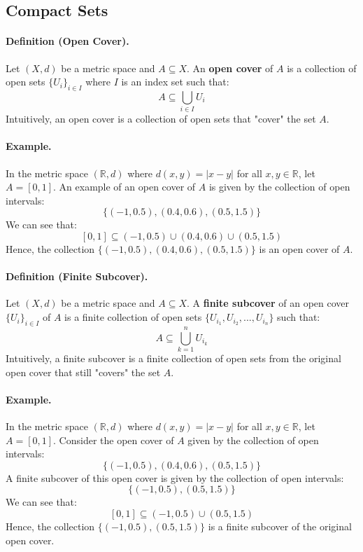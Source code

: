 \documentclass[openany]{book}
\numberwithin{equation}{section}
\begin{document}
\subsection{Compact Sets}
\paragraph{Definition (Open Cover).}

    Let $(X, d)$ be a metric space and $A \subseteq X$. An \textbf{open cover} of $A$ is a collection of open sets $\{U_i\}_{i \in I}$ where $I$ is an index set such that:
    $$A \subseteq \bigcup_{i \in I} U_i$$
    Intuitively, an open cover is a collection of open sets that "cover" the set $A$.
\par
\paragraph{Example.}

    In the metric space $(\mathbb{R}, d)$ where $d(x, y) = |x - y|$ for all $x, y \in \mathbb{R}$, let $A = [0, 1]$. An example of an open cover of $A$ is given by the collection of open intervals:
    $$\{(-1, 0.5), (0.4, 0.6), (0.5, 1.5)\}$$
    We can see that:
    $$[0, 1] \subseteq (-1, 0.5) \cup (0.4, 0.6) \cup (0.5, 1.5)$$
    Hence, the collection $\{(-1, 0.5), (0.4, 0.6), (0.5, 1.5)\}$ is an open cover of $A$.
\par
\paragraph{Definition (Finite Subcover).}

    Let $(X, d)$ be a metric space and $A \subseteq X$. A \textbf{finite subcover} of an open cover $\{U_i\}_{i \in I}$ of $A$ is a finite collection of open sets $\{U_{i_1}, U_{i_2}, ..., U_{i_n}\}$ such that:
    $$A \subseteq \bigcup_{k=1}^{n} U_{i_k}$$
    Intuitively, a finite subcover is a finite collection of open sets from the original open cover that still "covers" the set $A$.
\par
\paragraph{Example.}

    In the metric space $(\mathbb{R}, d)$ where $d(x, y) = |x - y|$ for all $x, y \in \mathbb{R}$, let $A = [0, 1]$. Consider the open cover of $A$ given by the collection of open intervals:
    $$\{(-1, 0.5), (0.4, 0.6), (0.5, 1.5)\}$$
    A finite subcover of this open cover is given by the collection of open intervals:
    $$\{(-1, 0.5), (0.5, 1.5)\}$$
    We can see that:
    $$[0, 1] \subseteq (-1, 0.5) \cup (0.5, 1.5)$$
    Hence, the collection $\{(-1, 0.5), (0.5, 1.5)\}$ is a finite subcover of the original open cover.
\par
\end{document}
